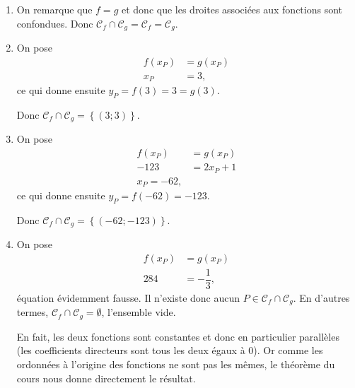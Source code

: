 \documentclass[12pt]{paper}
\theoremstyle{plain}
\theoremstyle{definition}
\newcommand{\C}{\mathcal{C}}
\begin{document}
{\begin{enumerate}
			Donc $\C_f \cap \C_g = \left\{ \left(-\dfrac65;\dfrac{32}5 \right) \right\}$.
		
		
		\item 
			On remarque que $f=g$ et donc que les droites associées aux fonctions sont confondues.			
			Donc $\C_f \cap \C_g = \C_f = \C_g$.
			
		\item
			On pose
				\begin{align*}
				f(x_P) &= g(x_P) \\
				x_P & = 3,
			\end{align*}
			ce qui donne ensuite $y_P = f(3) = 3 = g(3)$.
			
			Donc $\C_f \cap \C_g = \left\{ \left( 3; 3 \right) \right\}$.
			
			
		\item
			On pose
				\begin{align*}
				f(x_P) &= g(x_P) \\
				-123 & = 2x_P+1 \\
				x_P = -62,
			\end{align*}
			ce qui donne ensuite $y_P = f(-62) = -123$.
			
			Donc $\C_f \cap \C_g = \left\{ \left( -62; -123 \right) \right\}$.
			
			
		\item
			On pose
				\begin{align*}
				f(x_P) &= g(x_P) \\
				284 & = -\dfrac13,
			\end{align*}
			équation évidemment fausse.
			Il n'existe donc aucun $P \in \C_f \cap \C_g$. 
			En d'autres termes, $\C_f \cap \C_g = \emptyset$, l'ensemble vide.
			
			En fait, les deux fonctions sont constantes et donc en particulier parallèles (les coefficients directeurs sont tous les deux égaux à $0$).
			Or comme les ordonnées à l'origine des fonctions ne sont pas les mêmes, le théorème du cours nous donne directement le résultat.
	\end{enumerate}

}
\end{document}

